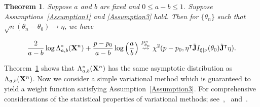 \documentclass[11pt]{article}
\newcommand{\myT}{\intercal}
\theoremstyle{plain}
\newtheorem{theorem}{\quad\quad Theorem}
\theoremstyle{definition}
\theoremstyle{remark}
\begin{document}
\begin{theorem}\label{theoremMain}
    Suppose $a$ and $b$ are fixed and $0\leq a-b\leq 1$.
    Suppose Assumptions~\ref{Assumption1} and \ref{Assumption3} hold.
    Then for $\{\theta_n\}$ such that $\sqrt{n}(\theta_n-\theta_0)\to \eta$, we have

        $$
        \frac{2}{a-b}
        \log \Lambda^*_{a,b} (\BX^n) 
        +\frac{p-p_0}{a-b}\log \left(\frac{a}{b}\right)
        \overset{P^n_{\theta_n}}{\rightsquigarrow}
        \chi^2(p-p_0, \eta^\myT\tilde \BJ I_{\xi|\nu}(\theta_0) \tilde\BJ^\myT\eta ).
        $$
\end{theorem}
Theorem~\ref{theoremMain} shows that $\Lambda_{a,b}^* (\mathbf{X}^n)$ has the same asymptotic distribution as $\Lambda_{a,b} (\mathbf{X}^n)$.
Now we consider a simple variational method which is guaranteed to yield a weight function satisfying Assumption~\ref{Assumption3}.
For comprehensive considerations of the statistical properties of variational methods; see~\cite{yixin2017},~\cite{pati2017} and~\cite{yunyang2017}.

\end{document}
